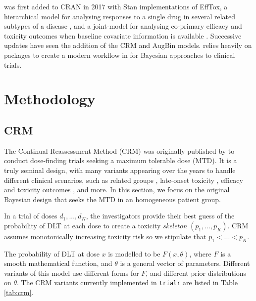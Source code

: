\documentclass[article]{jss}
\begin{document}
 was first added to CRAN in 2017 with Stan implementations
of EffTox, a hierarchical model for analysing responses to a single drug
in several related subtypes of a disease \citep{Thall2003}, and a
joint-model for analysing co-primary efficacy and toxicity outcomes when
baseline covariate information is available
\citep{brockMethodsIncreaseEfficiency}. Successive updates have seen the
addition of the CRM and AugBin models.  relies heavily on
 \citep{tidyverse} packages to create a modern workflow
in  for Bayesian approaches to clinical trials.

\newpage

\hypertarget{methodology}{%
\section{Methodology}\label{methodology}}

\hypertarget{crm}{%
\subsection{CRM}\label{crm}}

The Continual Reassessment Method (CRM) was originally published by
\cite{OQuigley1990} to conduct dose-finding trials seeking a maximum
tolerable dose (MTD). It is a truly seminal design, with many variants
appearing over the years to handle different clinical scenarios, such as
related groups \citep{oquigleyContinualReassessmentMethod2003},
late-onset toxicity \citep{Cheung2000}, efficacy and toxicity outcomes
\citep{Braun2002, Zhang2006}, and more. In this section, we focus on the
original Bayesian design that seeks the MTD in an homogeneous patient
group.

In a trial of doses \(d_1, ..., d_K\), the investigators provide their
best guess of the probability of DLT at each dose to create a toxicity
\textit{skeleton} \((p_1, ..., p_K)\). CRM assumes monotonically
increasing toxicity risk so we stipulate that \(p_1 < ... < p_K\).

The probability of DLT at dose \(x\) is modelled to be \(F(x, \theta)\),
where \(F\) is a smooth mathematical function, and \(\theta\) is a
general vector of parameters. Different variants of this model use
different forms for \(F\), and different prior distributions on
\(\theta\). The CRM variants currently implemented in \texttt{trialr}
are listed in Table \ref{tab:crm}.
\end{document}
